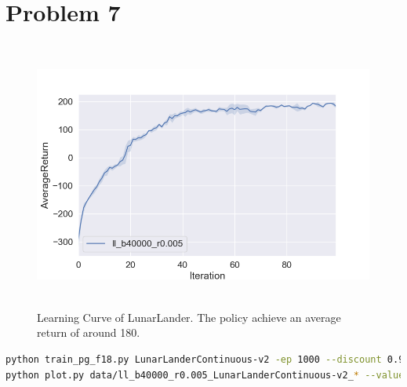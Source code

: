 \documentclass[12pt]{article}
\begin{document}
\newpage
\section*{Problem 7}
\begin{figure}[H]
  \centering
  \includegraphics[height=3.5in]{p7.png}
  \caption{Learning Curve of LunarLander. The policy achieve an average return of around 180.}
\end{figure}
\begin{lstlisting}[language=bash]
python train_pg_f18.py LunarLanderContinuous-v2 -ep 1000 --discount 0.99 -n 100 -e 3 -l 2 -s 64 -b 40000 -lr 0.005 -rtg --nn_baseline --exp_name ll_b40000_r0.005
python plot.py data/ll_b40000_r0.005_LunarLanderContinuous-v2_* --value AverageReturn
\end{lstlisting}

\newpage
\end{document}
